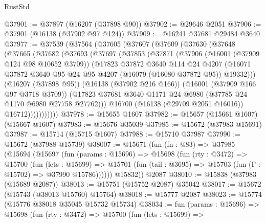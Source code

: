 \begin{lexlean}{RustStd}
\begin{coremodule}
@37901 := @37897 (@16207 (@37898 @90))
@37902 := @29646 @2051
@37906 := @37901 (@16138 (@37902 @97 @124))
@37909 := @16241 @37681 @29484 @3640
@37977 := @37539
    (@37564
      (@37605
        (@37607
          (@37609
            (@37630
              (@37648
                (@37665
                  (@37682
                    (@37693
                      (@37697
                        (@37853
                          (@37871
                            (@37906
                              (@16001 (@37909 @124 @98 @10652 @3709))
                              (@17823
                                @37872
                                @3640
                                @114
                                @24
                                @4207
                                (@16071
                                  @37872
                                  @3640
                                  @95
                                  @24
                                  @95
                                  @4207
                                  (@16079 (@16080 @37872 @95))
                                  @19332)))
                            (@16207 (@37898 @95))
                            (@16138 (@37902 @216 @166))
                            (@16001 (@37909 @166 @97 @3718 @3709))
                            (@17823
                              @37681
                              @3640
                              @1171
                              @24
                              @6980
                              (@37785 @24 @1170 @6980 @27758 @27762)))
                          @16700
                          (@16138 (@29709 @2051 @16016))
                          @16712)))))))))))
@37978 := @15655 @1607
@37982 := @15657 (@15661 @1607) (@15667 @1607)
@37983 := @15676 @35039
@37985 := @15672 (@37983 @15691)
@37987 := @15714 (@15715 @1607)
@37988 := @15710 @37987
@37990 := @15672 (@37988 @15739)
@38007 := @15671
    (fun (fn : @83) =>
    @37985
      (@15694
        (@15697
          (fun (params : @15696) =>
          @15698
            (fun (rty : @3472) =>
            @15700
              (fun (lets : @15699) =>
              @15701 (fun (tail : @3695) => @15703 (fun (Γ : @15702) => @37990 @15786))))))
        @15832))
    @2087
@38010 := @15838 (@37983 (@15689 @2087))
@38013 := @15751 (@15752 @2087) @35042
@38017 := @15672 (@15743 (@38013 @15760) @15764)
@38018 := @15777 @2087
@38023 := @15774 (@15776 @38018 @35045 @15732 @15734)
@38034 := fun (params : @15696) =>
  @15698
    (fun (rty : @3472) =>
    @15700
      (fun (lets : @15699) =>

\end{coremodule}
\end{lexlean}
